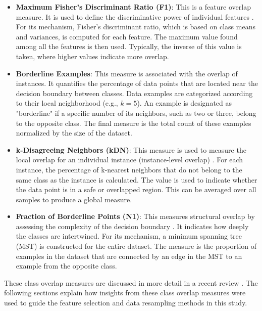 \begin{itemize}
\item \textbf{Maximum Fisher's Discriminant Ratio (\acrshort{F1})}: This is a feature overlap measure. It is used to define the discriminative power of individual features \cite{Lorena2019How}. For its mechanism, Fisher's discriminant ratio, which is based on class means and variances, is computed for each feature. The maximum value found among all the features is then used. Typically, the inverse of this value is taken, where higher values indicate more overlap.

\item \textbf{Borderline Examples}: This measure is associated with the overlap of instances. It quantifies the percentage of data points that are located near the decision boundary between classes. Data examples are categorized according to their local neighborhood (e.g., $k=5$). An example is designated as "borderline" if a specific number of its neighbors, such as two or three, belong to the opposite class. The final measure is the total count of these examples normalized by the size of the dataset.
\item \textbf{k-Disagreeing Neighbors (\acrshort{kDN})}: This measure is used to measure the local overlap for an individual instance (instance-level overlap) \cite{Smith2013Instance}. For each instance, the percentage of k-nearest neighbors that do not belong to the same class as the instance is calculated. The value is used to indicate whether the data point is in a safe or overlapped region. This can be averaged over all samples to produce a global measure.
\item \textbf{Fraction of Borderline Points (\acrshort{N1})}: This measures structural overlap by assessing the complexity of the decision boundary \cite{Ho2002Complexity}. It indicates how deeply the classes are intertwined. For its mechanism, a minimum spanning tree (\acrshort{MST}) is constructed for the entire dataset. The measure is the proportion of examples in the dataset that are connected by an edge in the MST to an example from the opposite class.
\end{itemize}
\vspace{2em}

These class overlap measures are discussed in more detail in a recent review \cite{Santos2022Joint}. The following sections explain how insights from these class overlap measures were used to guide the feature selection and data resampling methods in this study.

